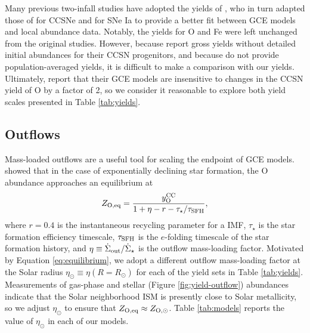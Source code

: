 \documentclass[twocolumn,twocolappendix]{aastex701}
\begin{document}
Many previous two-infall studies have adopted the yields of \citet{francois_evolution_2004}, who in turn adapted those of \citet{woosley_evolution_1995} for CCSNe and \citet{iwamoto_nucleosynthesis_1999} for SNe Ia to provide a better fit between GCE models and local abundance data. Notably, the yields for O and Fe were left unchanged from the original studies. However, because \citet{woosley_evolution_1995} report gross yields without detailed initial abundances for their CCSN progenitors, and because \citet{francois_evolution_2004} do not provide population-averaged yields, it is difficult to make a comparison with our yields. Ultimately, \citet{francois_evolution_2004} report that their GCE models are insensitive to changes in the CCSN yield of O by a factor of 2, so we consider it reasonable to explore both yield scales presented in Table \ref{tab:yields}.

\subsection{Outflows}
\label{sec:outflows}

Mass-loaded outflows are a useful tool for scaling the endpoint of GCE models. \citet{weinberg_equilibrium_2017} showed that in the case of exponentially declining star formation, the O abundance approaches an equilibrium at
\begin{equation}
    \label{eq:equilibrium}
    Z_{\rm O,eq} = \frac{y_{\rm O}^{\rm CC}}{1 + \eta - r - \tau_\star/\tau_{\rm SFH}},
\end{equation}
where $r=0.4$ is the instantaneous recycling parameter for a \citet{kroupa_variation_2001} IMF, $\tau_\star$ is the star formation efficiency timescale, $\tau_{\rm SFH}$ is the $e$-folding timescale of the star formation history, and $\eta\equiv \dot\Sigma_{\rm out}/\dot\Sigma_\star$ is the outflow mass-loading factor. Motivated by Equation \ref{eq:equilibrium}, we adopt a different outflow mass-loading factor at the Solar radius $\eta_\odot\equiv\eta(R=R_\odot)$ for each of the yield sets in Table \ref{tab:yields}. 
Measurements of gas-phase \citep[e.g.,][]{mendez-delgado_gradients_2022} and stellar (Figure \ref{fig:yield-outflow}) abundances indicate that the Solar neighborhood ISM is presently close to Solar metallicity, so we adjust $\eta_\odot$ to ensure that $Z_{\rm O,eq}\approx Z_{\rm O,\odot}$.
Table \ref{tab:models} reports the value of $\eta_\odot$ in each of our models.
\end{document}
